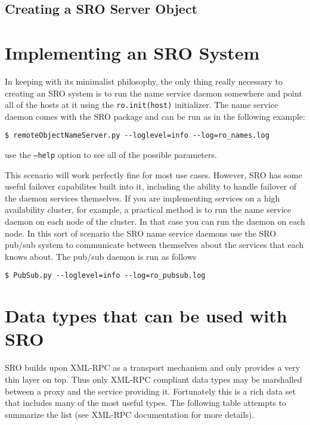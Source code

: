 \documentclass[11pt]{report}
\begin{document}
\section{Creating a SRO Server Object}

\chapter{Implementing an SRO System}
In keeping with its minimalist philosophy, the only thing really
necessary to creating an SRO system is to run the name service daemon
somewhere and point all of the hosts at it using the {\tt ro.init(host)}
initializer.  The name service daemon comes with the SRO package and can
be run as in the following example:
\begin{verbatim}
$ remoteObjectNameServer.py --loglevel=info --log=ro_names.log
\end{verbatim}
use the {\tt --help} option to see all of the possible parameters.

This scenario will work perfectly fine for most use cases.  However, SRO
has some useful failover capabilites built into it, including the
ability to handle failover of the daemon services themselves.  If you
are implementing services on a high availability cluster, for example, a
practical method is to run the name service daemon on each node of the
cluster.  In that case you can run the daemon on each node.
In this sort of scenario the SRO name service daemons use the SRO
pub/sub system to communicate between themselves about the services that
each knows about.  The pub/sub daemon is run as follows

\begin{verbatim}
$ PubSub.py --loglevel=info --log=ro_pubsub.log
\end{verbatim}

\appendix    %

\label{app:datatypes}
\chapter{Data types that can be used with SRO}
SRO builds upon XML-RPC as a transport mechanism and only provides a
very thin layer on top.  Thus only XML-RPC compliant data types may be
marshalled between a proxy and the service providing it.  Fortunately
this is a rich data set that includes many of the most useful types.
The following table attempts to summarize the list (see XML-RPC
documentation for more details).
\end{document}
